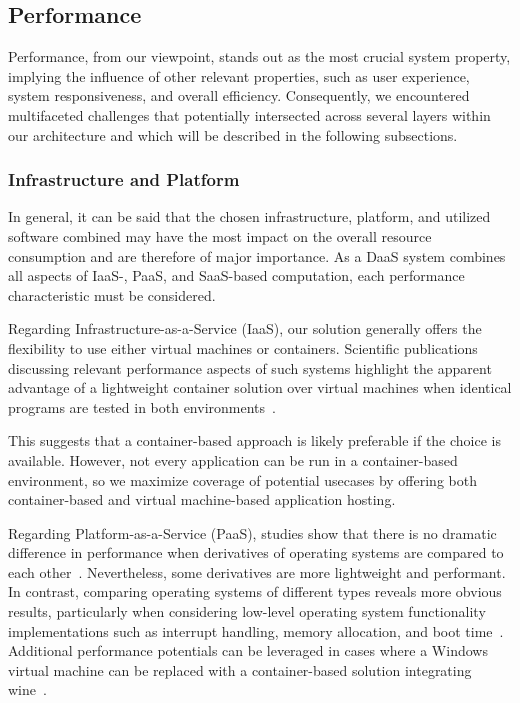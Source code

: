 \documentclass[runningheads]{llncs}
\begin{document}
\subsection{Performance}
Performance, from our viewpoint, stands out as the most crucial system property,
implying the influence of other  relevant properties,
such as user experience, system responsiveness, and overall efficiency.
Consequently, we encountered multifaceted challenges
that potentially intersected across several layers within our architecture
and which will be described in the following subsections.

\subsubsection{Infrastructure and Platform}
In general, it can be said that the chosen infrastructure, platform,
and utilized software combined may have the most impact on the overall resource consumption
and are therefore of major importance.
As a DaaS system combines all aspects of IaaS-, PaaS, and SaaS-based computation, each performance characteristic must be considered.

Regarding Infrastructure-as-a-Service (IaaS),
our solution generally offers the flexibility
to use either virtual machines or containers.
Scientific publications discussing relevant performance aspects of such systems
highlight the apparent advantage of a lightweight container solution
over virtual machines when identical programs are tested in both
environments~\cite{felter2015updated,potdar2020performance}.

This suggests that a container-based approach is likely preferable
if the choice is available.
However, not every application can be run
in a container-based environment,
so we maximize coverage of potential usecases
by offering both container-based and virtual machine-based application hosting.

Regarding Platform-as-a-Service (PaaS),
studies show that there is no dramatic difference in performance
when derivatives of operating systems are compared to each
other~\cite{balen2020performance,boras2020performance}.
Nevertheless, some derivatives are more lightweight and performant.
In contrast, comparing operating systems of different types
reveals more obvious results, particularly when considering
low-level operating system functionality implementations
such as interrupt handling, memory allocation, and boot
time~\cite{sulaiman2021comparison}.
Additional performance potentials can be leveraged
in cases where a Windows virtual machine can be replaced
with a container-based solution integrating 
wine~\cite{huang2012performance}.
\end{document}
